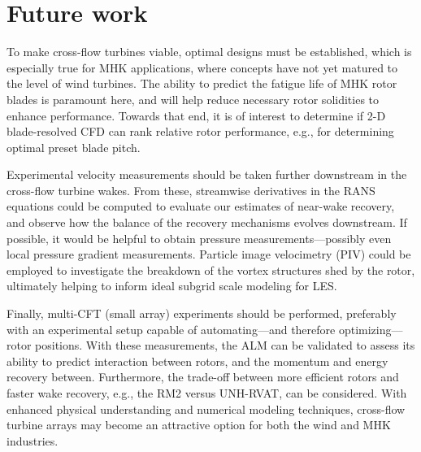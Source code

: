 \section{Future work}

To make cross-flow turbines viable, optimal designs must be established, which
is especially true for MHK applications, where concepts have not yet matured to
the level of wind turbines. The ability to predict the fatigue life of MHK rotor
blades is paramount here, and will help reduce necessary rotor solidities to
enhance performance. Towards that end, it is of interest to determine if 2-D
blade-resolved CFD can rank relative rotor performance, e.g., for determining
optimal preset blade pitch.

Experimental velocity measurements should be taken further downstream in the
cross-flow turbine wakes. From these, streamwise derivatives in the RANS
equations could be computed to evaluate our estimates of near-wake recovery, and
observe how the balance of the recovery mechanisms evolves downstream. If
possible, it would be helpful to obtain pressure measurements---possibly even
local pressure gradient measurements. Particle image velocimetry (PIV) could be
employed to investigate the breakdown of the vortex structures shed by the
rotor, ultimately helping to inform ideal subgrid scale modeling for LES.

Finally, multi-CFT (small array) experiments should be performed, preferably
with an experimental setup capable of automating---and therefore
optimizing---rotor positions. With these measurements, the ALM can be validated
to assess its ability to predict interaction between rotors, and the momentum
and energy recovery between. Furthermore, the trade-off between more efficient
rotors and faster wake recovery, e.g., the RM2 versus UNH-RVAT, can be
considered. With enhanced physical understanding and numerical modeling
techniques, cross-flow turbine arrays may become an attractive option for both
the wind and MHK industries.
